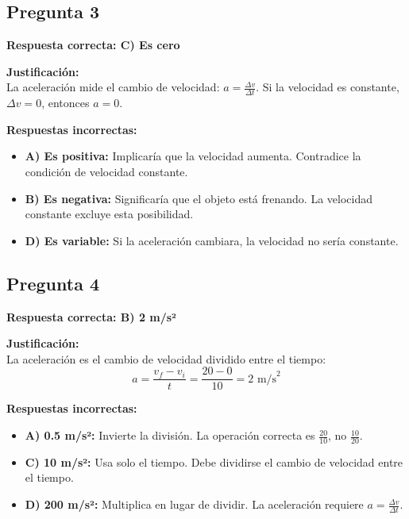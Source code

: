 \begin{respuestabox}
\subsection{Pregunta 3}
\textcolor{verdecorrecto}{\textbf{Respuesta correcta: C) Es cero}}

\textbf{Justificación:}\\
La aceleración mide el cambio de velocidad: $a = \frac{\Delta v}{\Delta t}$. Si la velocidad es constante, $\Delta v = 0$, entonces $a = 0$.

\textbf{Respuestas incorrectas:}
\begin{itemize}
    \item \textbf{A) Es positiva:} Implicaría que la velocidad aumenta. Contradice la condición de velocidad constante.
    \item \textbf{B) Es negativa:} Significaría que el objeto está frenando. La velocidad constante excluye esta posibilidad.
    \item \textbf{D) Es variable:} Si la aceleración cambiara, la velocidad no sería constante.
\end{itemize}
\end{respuestabox}

\newpage

\begin{respuestabox}
\subsection{Pregunta 4}
\textcolor{verdecorrecto}{\textbf{Respuesta correcta: B) 2 m/s²}}

\textbf{Justificación:}\\
La aceleración es el cambio de velocidad dividido entre el tiempo:
$$a = \frac{v_f - v_i}{t} = \frac{20 - 0}{10} = 2 \text{ m/s}^2$$

\textbf{Respuestas incorrectas:}
\begin{itemize}
    \item \textbf{A) 0.5 m/s²:} Invierte la división. La operación correcta es $\frac{20}{10}$, no $\frac{10}{20}$.
    \item \textbf{C) 10 m/s²:} Usa solo el tiempo. Debe dividirse el cambio de velocidad entre el tiempo.
    \item \textbf{D) 200 m/s²:} Multiplica en lugar de dividir. La aceleración requiere $a = \frac{\Delta v}{\Delta t}$.
\end{itemize}
\end{respuestabox}

